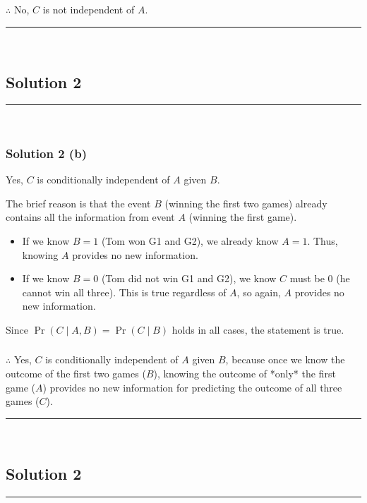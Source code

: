 \documentclass{article}
\begin{document}
\subsubsection*{\normalfont}{$\therefore$ No, $C$ is not independent of $A$.}

\noindent\rule{\textwidth}{0.4pt}\\

\newpage

\subsection*{Solution 2}
\noindent\rule{\textwidth}{0.4pt}\\
\subsubsection*{Solution 2 (b)}
Yes, $C$ is conditionally independent of $A$ given $B$.

The brief reason is that the event $B$ (winning the first two games) already contains all the information from event $A$ (winning the first game).
\begin{itemize}
    \item If we know $B=1$ (Tom won G1 and G2), we already know $A=1$. Thus, knowing $A$ provides no new information.
    \item If we know $B=0$ (Tom did not win G1 and G2), we know $C$ must be 0 (he cannot win all three). This is true regardless of $A$, so again, $A$ provides no new information.
\end{itemize}
Since $\Pr(C \mid A, B) = \Pr(C \mid B)$ holds in all cases, the statement is true.

\subsubsection*{\normalfont}{$\therefore$ Yes, $C$ is conditionally independent of $A$ given $B$, because once we know the outcome of the first two games ($B$), knowing the outcome of *only* the first game ($A$) provides no new information for predicting the outcome of all three games ($C$).}

\noindent\rule{\textwidth}{0.4pt}\\

\newpage

\subsection*{Solution 2}
\noindent\rule{\textwidth}{0.4pt}\\
\end{document}
